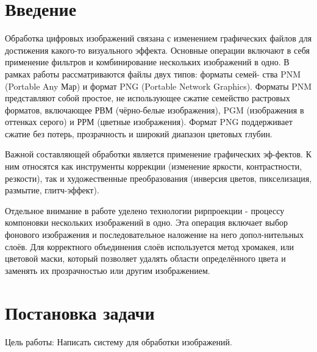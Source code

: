 \documentclass[a4paper,12pt]{article}
\begin{document}
	\newpage
	
	\tableofcontents
	
	\newpage
	\section*{Введение}
	
	Обработка цифровых изображений связана с изменением графических файлов для достижения какого-то визуального эффекта. Основные операции включают в себя применение фильтров и комбинирование нескольких изображений в одно.
	В рамках работы рассматриваются файлы двух типов: форматы семей-
	ства PNM (Portable Any Мар) и формат PNG (Portable Network Graphics).
	Форматы PNM представляют собой простое, не использующее сжатие семейство растровых форматов, включающее РВМ (чёрно-белые изображения), PGM (изображения в оттенках серого) и РРМ (цветные изображения). Формат PNG поддерживает сжатие без потерь, прозрачность и широкий диапазон цветовых глубин.
	
	Важной составляющей обработки является применение графических эф-фектов. К ним относятся как инструменты коррекции (изменение яркости, контрастности, резкости), так и художественные преобразования (инверсия цветов, пикселизация, размытие, глитч-эффект).
	
	Отдельное внимание в работе уделено технологии рирпроекции - процессу компоновки нескольких изображений в одно. Эта операция включает выбор фонового изображения и последовательное наложение на него допол-нительных слоёв. Для корректного объединения слоёв используется метод хромакея, или цветовой маски, который позволяет удалять области определённого цвета и заменять их прозрачностью или другим изображением.
	
	\newpage
	\section{Постановка задачи}
	Цель работы: Написать систему для обработки изображений.
	
\end{document}
